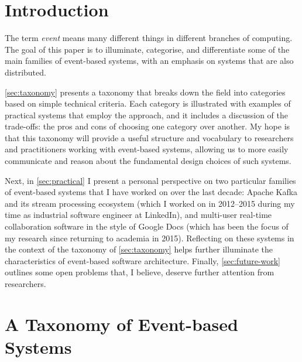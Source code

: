 \documentclass[sigconf]{acmart}
\begin{document}
\maketitle

\def\figureautorefname{Figure}
\def\sectionautorefname{Section}
\def\subsectionautorefname{Section}
\def\subsubsectionautorefname{Section}

\section{Introduction}

The term \emph{event} means many different things in different branches of computing.
The goal of this paper is to illuminate, categorise, and differentiate some of the main families of event-based systems, with an emphasis on systems that are also distributed.

\autoref{sec:taxonomy} presents a taxonomy that breaks down the field into categories based on simple technical criteria.
Each category is illustrated with examples of practical systems that employ the approach, and it includes a discussion of the trade-offs: the pros and cons of choosing one category over another.
My hope is that this taxonomy will provide a useful structure and vocabulary to researchers and practitioners working with event-based systems, allowing us to more easily communicate and reason about the fundamental design choices of such systems.

Next, in \autoref{sec:practical} I present a personal perspective on two particular families of event-based systems that I have worked on over the last decade: Apache Kafka and its stream processing ecosystem (which I worked on in 2012--2015 during my time as industrial software engineer at LinkedIn), and multi-user real-time collaboration software in the style of Google Docs (which has been the focus of my research since returning to academia in 2015).
Reflecting on these systems in the context of the taxonomy of \autoref{sec:taxonomy} helps further illuminate the characteristics of event-based software architecture.
Finally, \autoref{sec:future-work} outlines some open problems that, I believe, deserve further attention from researchers.

\section{A Taxonomy of Event-based Systems}\label{sec:taxonomy}
\end{document}

